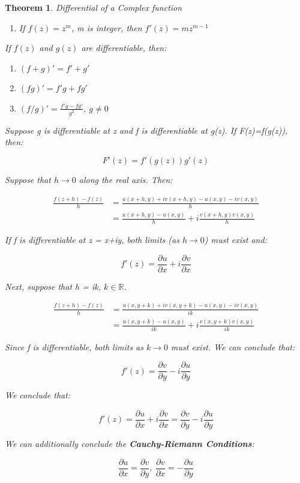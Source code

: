 \documentclass{article}
\newtheorem{theorem}{Theorem}[section]
\theoremstyle{definition}
\def\R{\mathbb{R}}
\begin{document}
\begin{theorem}
	Differential of a Complex function
\begin{enumerate}
	\item If $f(z) = z^m$, m is integer, then $f'(z) = mz^{m-1}$
\end{enumerate}
If $f(z)$ and $g(z)$ are differentiable, then:
\begin{enumerate}
	\item$(f+g)' = f'+g'$
	\item$(fg)' = f'g + fg'$
	\item$(f/g)' = \frac{f'g-fg'}{g^2},\ g \neq 0 $
\end{enumerate}


Suppose g is differentiable at z and f is differentiable at g(z). If F(z)=f(g(z)), then:

$$ F'(z) = f'(g(z))g'(z)$$

Suppose that $h \to 0$ along the real axis. Then:

\begin{align}
\frac{f(z+h) - f(z)}{h} & = \frac{u(x+h, y) + iv(x+h,y) - u(x,y) - iv(x,y)}{h}\\
& = \frac{u(x+h, y) - u(x,y) }{h} + i \frac{v(x+h,y) v(x,y)}{h}
\end{align}

If f is differentiable at z = x+iy, both limits (as $h \to 0$) must exist and:

$$f'(z) = \frac{\partial u}{\partial x} + i  \frac{\partial v}{\partial x}$$

Next, suppose that h = ik, $k \in \R$.

\begin{align}
\frac{f(z+h) - f(z)}{h} & = \frac{u(x, y+k) + iv(x,y+k) - u(x,y) - iv(x,y)}{ik}\\
& = \frac{u(x, y+k) - u(x,y) }{ik} + i \frac{v(x,y+k) v(x,y)}{ik}
\end{align}

Since f is differentiable, both limits as $k \to 0$ must exist. We can conclude that:

$$f'(z) = \frac{\partial v}{\partial y} - i  \frac{\partial u}{\partial y}$$

We conclude that:


$$\boxed{f'(z) = \frac{\partial u}{\partial x} + i  \frac{\partial v}{\partial x} = \frac{\partial v}{\partial y} - i  \frac{\partial u}{\partial y}}$$


We can additionally conclude the \textbf{Cauchy-Riemann Conditions}:

$$\frac{\partial u}{\partial x} = \frac{\partial v}{\partial y},\ \frac{\partial v}{\partial x} = -\frac{\partial u}{\partial y}$$

\end{theorem}
\end{document}
